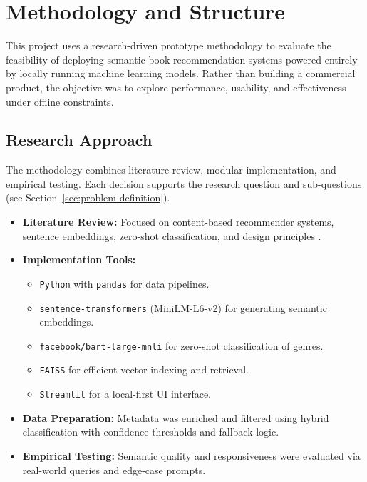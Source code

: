 \chapter{Methodology and Structure}
\label{chapter:methodology}

This project uses a research-driven prototype methodology to evaluate the feasibility of deploying semantic book recommendation systems powered entirely by locally running machine learning models. 
Rather than building a commercial product, the objective was to explore performance, usability, and effectiveness under offline constraints.

\section{Research Approach}
\label{sec:research-approach}

The methodology combines literature review, modular implementation, and empirical testing. Each decision supports the research question and sub-questions (see Section~\ref{sec:problem-definition}).

\begin{itemize}
    \item \textbf{Literature Review:} Focused on content-based recommender systems, sentence embeddings, zero-shot classification, and design principles \parencite{handson-ml}.

    \item \textbf{Implementation Tools:}
    \begin{itemize}
        \item \texttt{Python} with \texttt{pandas} for data pipelines.
        \item \texttt{sentence-transformers} (MiniLM-L6-v2) for generating semantic embeddings.
        \item \texttt{facebook/bart-large-mnli} for zero-shot classification of genres.
        \item \texttt{FAISS} for efficient vector indexing and retrieval.
        \item \texttt{Streamlit} for a local-first UI interface.
    \end{itemize}

    \item \textbf{Data Preparation:} Metadata was enriched and filtered using hybrid classification with confidence thresholds and fallback logic.

    \item \textbf{Empirical Testing:} Semantic quality and responsiveness were evaluated via real-world queries and edge-case prompts.
\end{itemize}

